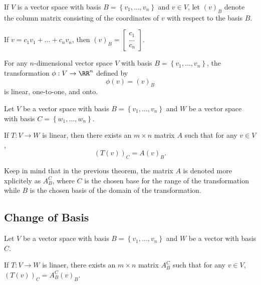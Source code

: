 \begin{definition}
  If $V$ is a vector space with basis $B = \left\{v_{1}, \dots, v_{n}\right\}$ and $v \in V$, let $(v)_{B}$ denote the column matrix consisting of the coordinates
  of $v$ with respect to the basis $B$.

  If $v = c_{1}v_{1} + \dots + c_{n}v_{n}$, then $(v)_{B} = \begin{bmatrix} c_{1} \\ \dots \\ c_{n} \end{bmatrix}$.
\end{definition}

\begin{lemma}
  For any $n$-dimensional vector space $V$ with basis $B = \left\{v_{1}, \dots,  v_{n}\right\}$, the transformation $\phi : V \to \RR^{n}$ defined by
  \begin{equation*}
    \phi(v) = (v)_{B}
  \end{equation*}
  is linear, one-to-one, and onto.
\end{lemma}

\begin{theorem}
  Let $V$ be a vector space with basis $B = \left\{v_{1}, \dots, v_{n}\right\}$ and $W$ be a vector space with basis $C = \left\{w_{1}, \dots, w_{n}\right\}$.

  If $T : V \to W$ is linear, then there exists an $m \times n$ matrix $A$ such that for any $v \in V$,
  \begin{equation*}
    (T(v))_{C} = A(v)_{B}.
  \end{equation*}
\end{theorem}

Keep in mind that in the previous theorem, the matrix $A$ is denoted more xplicitely as $A^{C}_{B}$,
where $C$ is the chosen base for the range of the transformation while $B$ is the chosen basis of the domain of the transformation.

\subsection{Change of Basis}
\begin{theorem}
  Let $V$ be a vector space with basis $B = \left\{v_{1}, \dots, v_{n}\right\}$ and $W$ be a vector with basis $C$.

  If $T : V \to W$ is linaer, there exists an $m \times n$ matrix $A^{C}_{B}$ such that for any $v \in V$, $(T(v))_{C} = A^{C}_{B}(v)_{B}$.
\end{theorem}

